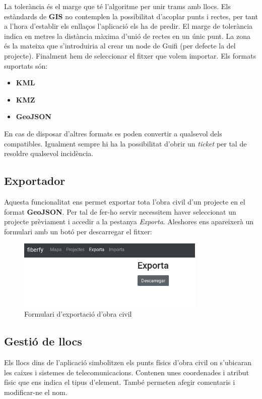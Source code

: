 \documentclass[a4paper]{article}
\begin{document}
	La tolerància és el marge que té l'algoritme per unir trams amb llocs. Els estàndards de \textbf{GIS} no contemplen la possibilitat d'acoplar punts i rectes, per tant a l'hora d'establir els enllaços l'aplicació els ha de predir. El marge de tolerància indica en metres la distància màxima d'unió de rectes en un únic punt.
	La zona és la mateixa que s'introduiria al crear un node de Guifi (per defecte la del projecte).
	Finalment hem de seleccionar el fitxer que volem importar. Els formats suportats són:
	\begin{itemize}
		\item \textbf{KML}
		\item \textbf{KMZ}
		\item \textbf{GeoJSON}
	\end{itemize}
	
	En cas de disposar d'altres formats es poden convertir a qualsevol dels compatibles. Igualment sempre hi ha la possibilitat d'obrir un \emph{ticket} per tal de resoldre qualsevol incidència.
	
	\subsection{Exportador}
	Aquesta funcionalitat ens permet exportar tota l'obra civil d'un projecte en el format \textbf{GeoJSON}. Per tal de fer-ho servir necessitem haver seleccionat un projecte prèviament i accedir a la pestanya \emph{Exporta}. Aleshores ens apareixerà un formulari amb un botó per descarregar el fitxer:
	
	\begin{figure}[H]
		\centering
		\includegraphics[width=0.8\textwidth]{images/export_form.png}
		\caption{Formulari d'exportació d'obra civil}
		\label{fig:export-form}
	\end{figure}
	
	\subsection{Gestió de llocs}
	Els llocs dins de l'aplicació simbolitzen els punts físics d'obra civil on s'ubicaran les caixes i sistemes de telecomunicacions. Contenen unes coordenades i atribut físic que ens indica el tipus d'element. També permeten afegir comentaris i modificar-ne el nom.
	
\end{document}

